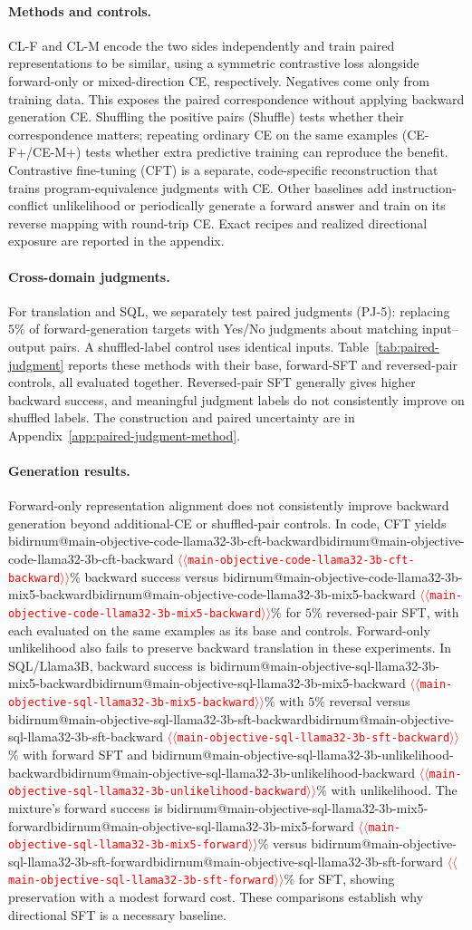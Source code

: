 \documentclass[11pt]{article}
\makeatletter
\providecommand{\NUM}[1]{%
  \ifcsname bidirnum@#1\endcsname\csname bidirnum@#1\endcsname
  \else\textcolor{red}{$\langle\langle$\texttt{#1}$\rangle\rangle$}\fi}
\makeatother
\begin{document}

\paragraph{Methods and controls.}
CL-F and CL-M encode the two sides independently and train paired representations to
be similar, using a symmetric contrastive loss alongside forward-only or mixed-direction
CE, respectively. Negatives come only from training data. This exposes the paired
correspondence without applying backward generation CE. Shuffling the positive pairs
(Shuffle) tests whether their correspondence matters; repeating ordinary CE on the same
examples (CE-F+/CE-M+) tests whether extra predictive training can reproduce the benefit.
Contrastive fine-tuning (CFT) is a separate, code-specific reconstruction that trains
program-equivalence judgments with CE. Other baselines add instruction-conflict
unlikelihood or periodically generate a forward answer and train on its reverse mapping
with round-trip CE. Exact recipes and realized directional exposure are reported in the
appendix.

\paragraph{Cross-domain judgments.}
For translation and SQL, we separately test paired judgments (PJ-5): replacing $5\%$
of forward-generation targets with Yes/No judgments about matching input--output pairs.
A shuffled-label control uses identical inputs. Table~\ref{tab:paired-judgment} reports
these methods with their base, forward-SFT and reversed-pair controls, all evaluated
together. Reversed-pair SFT generally gives higher backward success, and meaningful
judgment labels do not consistently improve on shuffled labels. The construction and
paired uncertainty are in Appendix~\ref{app:paired-judgment-method}.


\paragraph{Generation results.}
Forward-only representation alignment does not consistently improve backward generation
beyond additional-CE or shuffled-pair controls. In code, CFT yields
\NUM{main-objective-code-llama32-3b-cft-backward}\% backward success versus
\NUM{main-objective-code-llama32-3b-mix5-backward}\% for $5\%$ reversed-pair SFT,
with each evaluated on the same examples as its base and controls. Forward-only
unlikelihood also fails to preserve backward translation in these experiments.
In SQL/Llama3B, backward success is
\NUM{main-objective-sql-llama32-3b-mix5-backward}\% with $5\%$ reversal versus
\NUM{main-objective-sql-llama32-3b-sft-backward}\% with forward SFT and
\NUM{main-objective-sql-llama32-3b-unlikelihood-backward}\% with unlikelihood.
The mixture's forward success is
\NUM{main-objective-sql-llama32-3b-mix5-forward}\% versus
\NUM{main-objective-sql-llama32-3b-sft-forward}\% for SFT, showing preservation
with a modest forward cost.
These comparisons establish why directional SFT is a necessary baseline.
\end{document}
